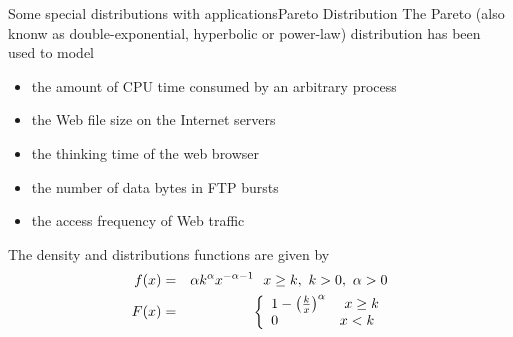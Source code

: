 \documentclass[handout]{beamer}
\begin{document}
\begin{frame}{Some special distributions with applications}{Pareto Distribution}
 The Pareto (also knonw as double-exponential, hyperbolic or power-law) distribution has been used 
to model 
\begin{itemize}
\item the amount of CPU time consumed by an arbitrary process
\item the Web file size on the Internet servers
\item the thinking time of the web browser
\item the number of data bytes in FTP bursts
\item the access frequency of Web traffic 
\end{itemize}
The density and distributions functions are given by
 \begin{eqnarray*}
f(x) &=& \alpha k^{\alpha} x^{-\alpha -1} \ \ x \geq k, \ k>0, \ \alpha > 0\\ 
F(x) &=& \left\{ \begin{array}{l l}
            1 - \left( \frac{k}{x} \right) ^\alpha & \ x \geq k \\
            0 & x < k    
           \end{array} \right. 
 \end{eqnarray*}
\end{frame}
\end{document}
